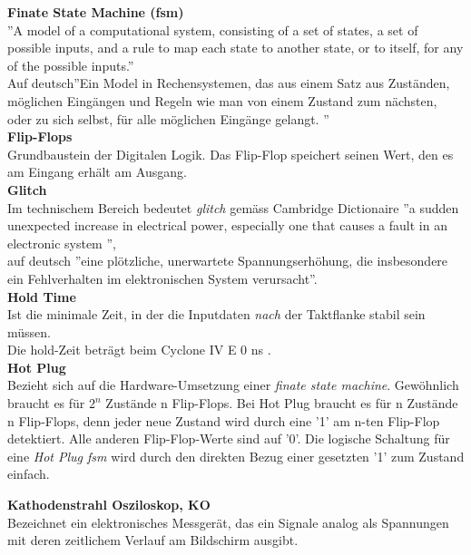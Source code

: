\textbf{Finate State Machine (fsm)}\\
''A model of a computational system, consisting of a set of states, a set of possible inputs, and a rule to map each state to another state, or to itself, for any of the possible inputs.''\cite{fsm}\\
Auf deutsch''Ein Model in Rechensystemen, das aus einem Satz aus Zuständen, möglichen Eingängen und Regeln wie man von einem Zustand zum nächsten, oder zu sich selbst, für alle möglichen Eingänge gelangt. ''\\

\textbf{Flip-Flops}\\
Grundbaustein der Digitalen Logik. Das Flip-Flop speichert seinen Wert, den es am Eingang erhält am Ausgang.\\

\textbf{Glitch}\\
Im technischem Bereich bedeutet \textit{glitch} gemäss Cambridge Dictionaire ''a sudden unexpected increase in electrical power, especially one that causes a fault in an electronic system ''\cite{dictionair},\\
auf deutsch ''eine plötzliche, unerwartete Spannungserhöhung, die insbesondere ein Fehlverhalten im elektronischen System verursacht''.\\

\textbf{Hold Time}\\
Ist die minimale Zeit, in der die Inputdaten \textit{nach} der Taktflanke stabil sein müssen.\\
Die hold-Zeit beträgt beim  Cyclone IV E 0 ns \cite{Handbook_Altera}.\\

\textbf{Hot Plug}\\
Bezieht sich auf die Hardware-Umsetzung einer \textit{finate state machine}. Gewöhnlich braucht es für \begin{math} 2^n \end{math} Zustände n Flip-Flops. Bei Hot Plug braucht es für n Zustände n Flip-Flops, denn jeder neue Zustand wird durch eine '1' am n-ten Flip-Flop detektiert. Alle anderen Flip-Flop-Werte sind auf '0'. Die logische Schaltung für eine \textit{Hot Plug fsm} wird durch den direkten Bezug einer gesetzten '1' zum Zustand einfach.


\textbf{Kathodenstrahl Osziloskop, KO}\\
Bezeichnet ein elektronisches Messgerät, das ein Signale analog als Spannungen mit deren zeitlichem Verlauf am Bildschirm ausgibt.\\

